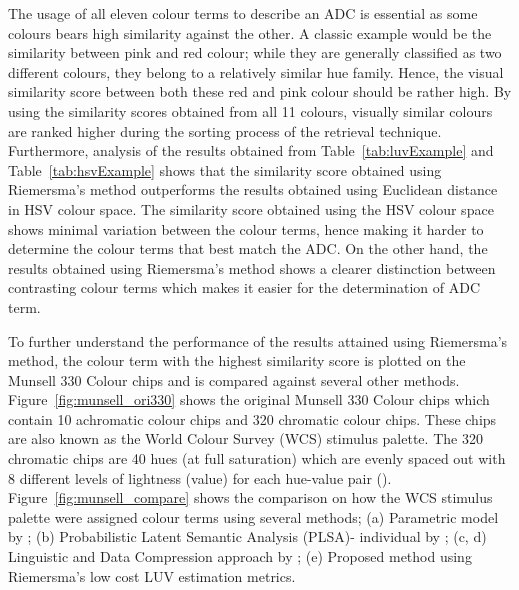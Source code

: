 The usage of all eleven colour terms to describe an ADC is essential as some colours bears high similarity against the other. A classic example would be the similarity between pink and red colour; while they are generally classified as two different colours, they belong to a relatively similar hue family. Hence, the visual similarity score between both these red and pink colour should be rather high. By using the similarity scores obtained from all 11 colours, visually similar colours are ranked higher during the sorting process of the retrieval technique.
Furthermore, analysis of the results obtained from Table~\ref{tab:luvExample} and Table~\ref{tab:hsvExample} shows that the similarity score obtained using Riemersma's method outperforms the results obtained using Euclidean distance in HSV colour space.
The similarity score obtained using the HSV colour space shows minimal variation between the colour terms, hence making it harder to determine the colour terms that best match the ADC.
On the other hand, the results obtained using Riemersma's method shows a clearer distinction between contrasting colour terms which makes it easier for the determination of ADC term.

To further understand the performance of the results attained using Riemersma's method, the colour term with the highest similarity score is plotted on the Munsell 330 Colour chips and is compared against several other methods.
Figure~\ref{fig:munsell_ori330} shows the original Munsell 330 Colour chips which contain 10 achromatic colour chips and 320 chromatic colour chips.
These chips are also known as the World Colour Survey (WCS) stimulus palette.
The 320 chromatic chips are 40 hues (at full saturation) which are evenly spaced out with 8 different levels of lightness (value) for each hue-value pair (\cite{kay2009world}).
Figure~\ref{fig:munsell_compare} shows the comparison on how the WCS stimulus palette were assigned colour terms using several methods; (a) Parametric model by ; (b) Probabilistic Latent Semantic Analysis (PLSA)- individual by ; (c, d) Linguistic and Data Compression approach by ; (e) Proposed method using Riemersma's low cost LUV estimation metrics.

